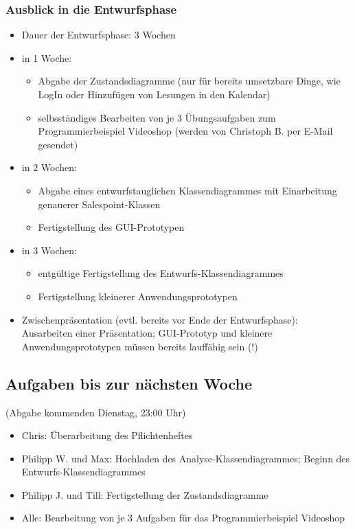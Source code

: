 \documentclass[12pt,a4paper]{article}
\begin{document}
\subsubsection*{Ausblick in die Entwurfsphase}
\begin{itemize}
\item Dauer der Entwurfsphase: 3 Wochen
\item in 1 Woche:
\begin{itemize}
\item Abgabe der Zustandsdiagramme (nur für bereits umsetzbare Dinge, wie LogIn oder Hinzufügen von Lesungen in den Kalendar)
\item selbsständiges Bearbeiten von je 3 Übungsaufgaben zum Programmierbeispiel Videoshop (werden von Christoph B. per E-Mail gesendet)
\end{itemize}
\item in 2 Wochen: 
\begin{itemize}
\item Abgabe eines entwurfstauglichen Klassendiagrammes mit Einarbeitung genauerer Salespoint-Klassen
\item Fertigstellung des GUI-Prototypen
\end{itemize}
\item in 3 Wochen:
\begin{itemize}
\item entgültige Fertigstellung des Entwurfs-Klassendiagrammes
\item Fertigstellung kleinerer Anwendungsprototypen
\end{itemize}
\item Zwischenpräsentation (evtl. bereits vor Ende der Entwurfsphase): Ausarbeiten einer Präsentation; GUI-Prototyp und kleinere Anwendungsprototypen müssen bereits lauffähig sein (!)
\end{itemize}

\subsection*{Aufgaben bis zur nächsten Woche}
(Abgabe kommenden Dienstag, 23:00 Uhr)
\medskip
\begin{itemize}
\item Chris: Überarbeitung des Pflichtenheftes
\item Philipp W. und Max: Hochladen des Analyse-Klassendiagrammes; Beginn des Entwurfs-Klassendiagrammes
\item Philipp J. und Till: Fertigstellung der Zustandsdiagramme
\item Alle: Bearbeitung von je 3 Aufgaben für das Programmierbeispiel Videoshop
\end{itemize}
\end{document}
